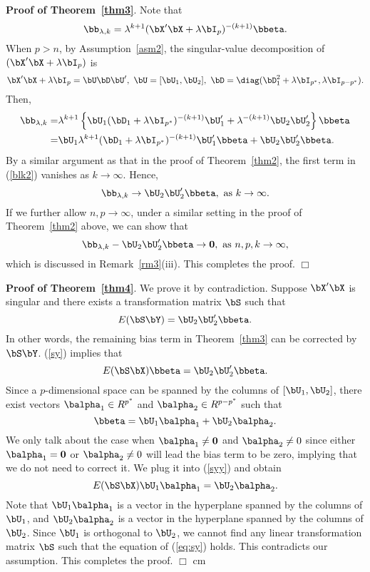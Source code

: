 {{{\bf Proof of Theorem~\ref{thm3}}. Note that
\[\bb_{\lambda,k}=\lambda^{k+1}(\bX'\bX+\lambda\bI_p)^{-(k+1)}\bbeta.\]
When $p>n$, by Assumption~\ref{asm2}, the singular-value decomposition of $(\bX'\bX+\lambda\bI_p)$ is
\[\bX'\bX+\lambda\bI_p=\bU\bD\bU',\,\,\bU=[\bU_1,\bU_2],\,\,\bD=\diag(\bD_1^2+\lambda\bI_{p^*},\lambda\bI_{p-p^*}).\]
Then, 
\begin{align}\label{blk2}
 \bb_{\lambda,k}=&\lambda^{k+1}\left\{\bU_1(\bD_1+\lambda\bI_{p^*})^{-(k+1)}\bU_1'+\lambda^{-(k+1)}\bU_2\bU_2'\right\}\bbeta\notag\\
 =&\bU_1\lambda^{k+1}(\bD_1+\lambda\bI_{p^*})^{-(k+1)}\bU_1'\bbeta+\bU_2\bU_2'\bbeta.
\end{align}
By a similar argument as that in the proof of Theorem~\ref{thm2}, the first term in (\ref{blk2}) vanishes as $k\rightarrow \infty$. Hence, 
\[ \bb_{\lambda,k}\rightarrow \bU_2\bU_2'\bbeta,\,\,\text{as $k\rightarrow\infty$}.\]
If we further allow $n,p\rightarrow\infty$, under a similar setting in the proof of Theorem~\ref{thm2} above, we can show that
\[ \bb_{\lambda,k}-\bU_2\bU_2'\bbeta\rightarrow {\bf 0},\,\,\text{as $n,p,k\rightarrow\infty$},\]
which is discussed in Remark~\ref{rm3}(iii).
This completes the proof. $\Box$
\vskip 0.6cm

{\bf Proof of Theorem~\ref{thm4}}. We prove it by contradiction. Suppose $\bX'\bX$ is singular and there exists a transformation matrix $\bS$ such that
\begin{equation}\label{sy}
 E(\bS\bY)=\bU_2\bU_2'\bbeta.
\end{equation}
In other words, the remaining bias term in Theorem~\ref{thm3} can be corrected by $\bS\bY$.
(\ref{sy}) implies that
\begin{equation}\label{syy}
E(\bS\bX)\bbeta=\bU_2\bU_2'\bbeta.    
\end{equation}
Since a $p$-dimensional space can be spanned by the columns of $[\bU_1,\bU_2]$, there exist vectors $\balpha_1\in R^{p^*}$ and $\balpha_2\in R^{p-p^*}$ such that
\[\bbeta=\bU_1\balpha_1+\bU_2\balpha_2.\]
We only talk about the case when $\balpha_1\neq{\bf 0}$ and $\balpha_2\neq 0 $ since either $\balpha_1={\bf 0}$ or $\balpha_2\neq 0 $ will lead the bias term to be zero, implying that we do not need to correct it.
We plug it into (\ref{syy}) and obtain
\begin{equation}\label{eq:sy}
 E(\bS\bX)\bU_1\balpha_1=\bU_2\balpha_2.
\end{equation}
Note that $\bU_1\balpha_1$ is a vector in the hyperplane spanned by the columns of $\bU_1$, and $\bU_2\balpha_2$ is a vector in the hyperplane spanned by the columns of $\bU_2$. Since $\bU_1$ is orthogonal to $\bU_2$, we cannot find any linear transformation matrix $\bS$ such that the equation of (\ref{eq:sy}) holds. This contradicts our assumption. This completes the proof. $\Box$
 cm

}}
